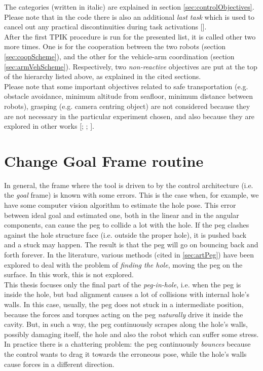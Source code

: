 \noindent The categories (written in italic) are explained in section \ref{sec:controlObjectives}. Please note that in the code there is also an additional \textit{last task} which is used to cancel out any practical discontinuities during task activations [\cite{IntroMaris1}].\\

After the first TPIK procedure is run for the presented list, it is called other two more times. One is for the cooperation between the two robots (section \ref{sec:coopScheme}), and the other for the vehicle-arm coordination (section \ref{sec:armVehScheme}). Respectively, two \textit{non-reactive} objectives are put at the top of the hierarchy listed above, as explained in the cited sections.\\

Please note that some important objectives related to safe transportation (e.g. obstacle avoidance, minimum altitude from seafloor, minimum distance between robots), grasping (e.g. camera centring object) are not considered because they are not necessary in the particular experiment chosen, and also because they are explored in other works [\cite{IntroMaris2}; \cite{tesiWander}; \cite{IntroRecent}].\\


\section{Change Goal Frame routine}
\label{sec:changeGoal}
In general, the frame where the tool is driven to by the control architecture (i.e. the \textit{goal} frame) is known with some errors. This is the case when, for example, we have some computer vision algorithm to estimate the hole pose. 
This error between ideal goal and estimated one, both in the linear and in the angular components, can cause the peg to collide a lot with the hole. If the peg clashes against the hole structure face (i.e. outside the proper hole), it is pushed back and a stuck may happen. The result is that the peg will go on bouncing back and forth forever. In the literature, various methods (cited in \ref{sec:artPeg}) have been explored to deal with the problem of \textit{finding the hole}, moving the peg on the surface. In this work, this is not explored.\\

This thesis focuses only the final part of the \textit{peg-in-hole}, i.e. when the peg is inside the hole, but bad alignment causes a lot of collisions with internal hole's  walls. In this case, usually, the peg does not stuck in a intermediate position, because the forces and torques acting on the peg \textit{naturally} drive it inside the cavity. But, in such a way, the peg continuously scrapes along the hole's walls, possibly damaging itself, the hole and also the robot which can suffer some stress. In practice there is a chattering problem: the peg continuously \textit{bounces} 
because the control wants to drag it towards the erroneous pose, while the hole's walls cause forces in a different direction.\\

